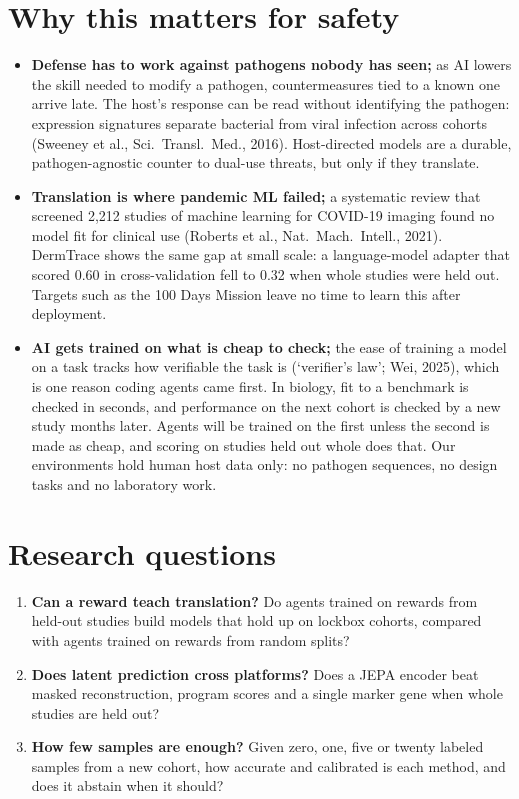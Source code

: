 \documentclass[11pt]{article}
\begin{document}
\section*{Why this matters for safety}
\begin{itemize}
\item \textbf{Defense has to work against pathogens nobody has seen;} as AI lowers the skill needed to modify a pathogen, countermeasures tied to a known one arrive late. The host's response can be read without identifying the pathogen: expression signatures separate bacterial from viral infection across cohorts (Sweeney et al., Sci.\ Transl.\ Med., 2016). Host-directed models are a durable, pathogen-agnostic counter to dual-use threats, but only if they translate.
\item \textbf{Translation is where pandemic ML failed;} a systematic review that screened 2,212 studies of machine learning for COVID-19 imaging found no model fit for clinical use (Roberts et al., Nat.\ Mach.\ Intell., 2021). DermTrace shows the same gap at small scale: a language-model adapter that scored 0.60 in cross-validation fell to 0.32 when whole studies were held out. Targets such as the 100 Days Mission leave no time to learn this after deployment.
\item \textbf{AI gets trained on what is cheap to check;} the ease of training a model on a task tracks how verifiable the task is (`verifier's law'; Wei, 2025), which is one reason coding agents came first. In biology, fit to a benchmark is checked in seconds, and performance on the next cohort is checked by a new study months later. Agents will be trained on the first unless the second is made as cheap, and scoring on studies held out whole does that. Our environments hold human host data only: no pathogen sequences, no design tasks and no laboratory work.
\end{itemize}

\section*{Research questions}
\begin{enumerate}
\item \textbf{Can a reward teach translation?} Do agents trained on rewards from held-out studies build models that hold up on lockbox cohorts, compared with agents trained on rewards from random splits?
\item \textbf{Does latent prediction cross platforms?} Does a JEPA encoder beat masked reconstruction, program scores and a single marker gene when whole studies are held out?
\item \textbf{How few samples are enough?} Given zero, one, five or twenty labeled samples from a new cohort, how accurate and calibrated is each method, and does it abstain when it should?
\end{enumerate}
\end{document}
